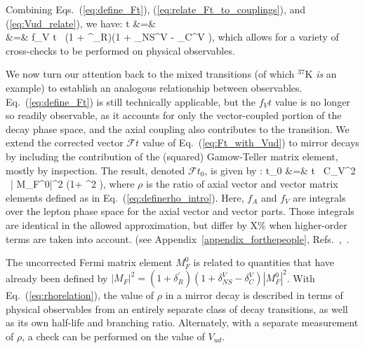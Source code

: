 Combining Eqs.~(\ref{eq:define_Ft}), (\ref{eq:relate_Ft_to_couplings}), and (\ref{eq:Vud_relate}), we have:
\bea
{}t &=&  
\nonumber \\
&=& 
f_V t \, (1 + \delta^\prime_R)(1 + \delta_{NS}^V - \delta_C^{V} ), 
\label{eq:Ft_with_Vud}
\eea
which allows for a variety of cross-checks to be performed on physical observables.  

We now turn our attention back to the mixed transitions (of which $^{37}$K \emph{is} an example) to establish an analogous relationship between observables.  Eq.~(\ref{eq:define_Ft}) is still technically applicable, but the $f_Vt$ value is no longer so readily observable, as it accounts for only the vector-coupled portion of the decay phase space, and the axial coupling also contributes to the transition.  We extend the corrected vector $\mathcal{F}t$ value of Eq.~(\ref{eq:Ft_with_Vud}) to mirror decays by including the contribution of the (squared) Gamow-Teller matrix element, mostly by inspection.  The result, denoted $\mathcal{F}t_0$, is given by
\cite{shidling2014}
\cite{naviliat2009april}
\cite{ben_Abeta}:
\bea
{}t_0 &=&  t \, C_V^2 \, | M_F^0|^2 \left(1+ \rho^2 \right),
\label{eq:rhorelation}
\eea
where $\rho$ is the ratio of axial vector and vector matrix elements defined as in Eq.~(\ref{eq:definerho_intro}).  
Here, $f_A$ and $f_V$ are integrals over the lepton phase space for the axial vector and vector parts. Those integrals are identical in the allowed approximation, but differ by X\% when higher-order terms are taken into account.
(see Appendix~\ref{appendix_forthepeople}, Refs.~\cite{holstein},~\cite{Hayen2021}.


\color{blue}The uncorrected Fermi matrix element $M_F^0$ is related to quantities that have already been defined by $| M_F |^2 =  (1 + \delta^\prime_R)(1 + \delta_{NS}^V - \delta_C^{V} ) | M_F^0 |^2 $.  
\color{black}
With Eq.~(\ref{eq:rhorelation}), the value of $\rho$ in a mirror decay is described in terms of physical observables from an entirely separate class of decay transitions, as well as its own half-life and branching ratio.  Alternately, with a separate measurement of $\rho$, a check can be performed on the value of $V_{ud}$.



